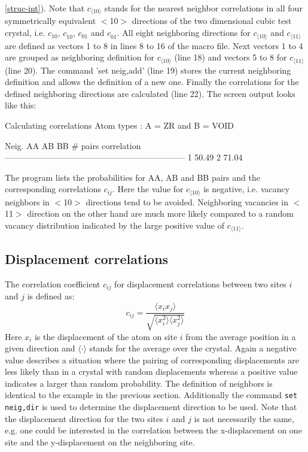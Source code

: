 \ref{struc-int}).  Note that $c_{\langle 10 \rangle}$ stands for the
nearest neighbor correlations in all four symmetrically equivalent
$<$10$>$ directions of the two dimensional cubic test crystal, i.e.
$c_{10}$, $c_{\overline{1}0}$, $c_{01}$ and $c_{0 \overline{1}}$.
All eight neighboring directions for $c_{\langle 10 \rangle}$ and
$c_{\langle 11 \rangle}$ are defined as vectors 1 to 8 in lines 8 to
16 of the macro file.  Next vectors 1 to 4 are grouped as
neighboring definition for $c_{\langle 10 \rangle}$ (line 18) and
vectors 5 to 8 for $c_{\langle 11 \rangle}$ (line 20).  The command
'set neig,add' (line 19) stores the current neighboring definition
and allows the definition of a new one.  Finally the correlations
for the defined neighboring directions are calculated (line 22). The
screen output looks like this:
%
\begin{MacVerbatim}
    Calculating correlations
        Atom types : A = ZR   and B = VOID

        Neig.     AA         AB         BB         # pairs    correlation
        -----------------------------------------------------------------
           1    50.49 %
           2    71.04 %
\end{MacVerbatim}
%
The program lists the probabilities for AA, AB and BB pairs and the
corresponding correlations $c_{ij}$.  Here the value for $c_{\langle
10 \rangle}$ is negative, i.e.  vacancy neighbors in $<$10$>$
directions tend to be avoided.  Neighboring vacancies in $<$11$>$
direction on the other hand are much more likely compared to a
random vacancy distribution indicated by the large positive value of
$c_{\langle 11 \rangle}$.

\subsection*{Displacement correlations \label{chem-corr-disp}}

The correlation coefficient $c_{ij}$ for displacement correlations
between two sites $i$ and $j$ is defined as:
%
\begin{equation}
    c_{ij} = \frac { \langle x_{i} x_{j} \rangle }
                   { \sqrt { \langle x_{i}^{2} \rangle
                             \langle x_{j}^{2} \rangle } }
    \label{chem-eq2}
\end{equation}
%
Here $x_{i}$ is the displacement of the atom on site $i$ from the
average position in a given direction and $\langle \cdot \rangle$
stands for the average over the crystal.  Again a negative value
describes a situation where the pairing of corresponding
displacements are less likely than in a crystal with random
displacements whereas a positive value indicates a larger than
random probability. The definition of neighbors is identical to the
example in the previous section.  Additionally the command {\tt set
neig,dir} is used to determine the displacement direction to be
used. Note that the displacement direction for the two sites $i$ and
$j$ is not necessarily the same, e.g.  one could be interested in
the correlation between the x-displacement on one site and the
y-displacement on the neighboring site.

